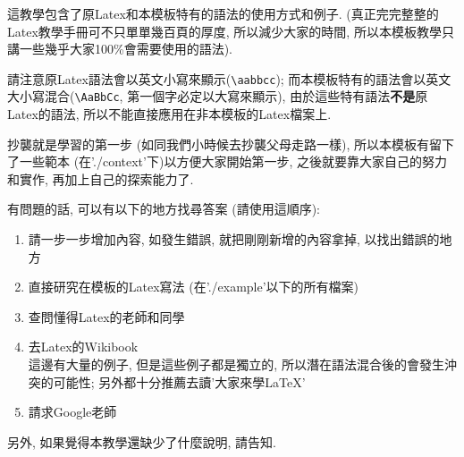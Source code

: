 

這教學包含了原Latex和本模板特有的語法的使用方式和例子. (真正完完整整的Latex教學手冊可不只單單幾百頁的厚度, 所以減少大家的時間, 所以本模板教學只講一些幾乎大家100\%會需要使用的語法). 

請注意原Latex語法會以英文小寫來顯示(\verb|\aabbcc|); 而本模板特有的語法會以英文大小寫混合(\verb|\AaBbCc|, 第一個字必定以大寫來顯示), 由於這些特有語法\textbf{不是}原Latex的語法, 所以不能直接應用在非本模板的Latex檔案上.

抄襲就是學習的第一步 (如同我們小時候去抄襲父母走路一樣), 所以本模板有留下了一些範本 (在'./context'下)以方便大家開始第一步, 之後就要靠大家自己的努力和實作, 再加上自己的探索能力了.

有問題的話, 可以有以下的地方找尋答案 (請使用這順序):
\begin{enumerate}
  \item 請一步一步增加內容, 如發生錯誤, 就把剛剛新增的內容拿掉, 以找出錯誤的地方
  \item 直接研究在模板的Latex寫法 (在'./example'以下的所有檔案)
  \item 查問懂得Latex的老師和同學
  \item 去Latex的Wikibook\\
        這邊有大量的例子, 但是這些例子都是獨立的, 所以潛在語法混合後的會發生沖突的可能性; 另外都十分推薦去讀'大家來學LaTeX' 
  \item 請求Google老師
\end{enumerate}

另外, 如果覺得本教學還缺少了什麼說明, 請告知.


\newpage
\newpage
\newpage
\newpage
\newpage
\newpage
\newpage

\EndChapter
